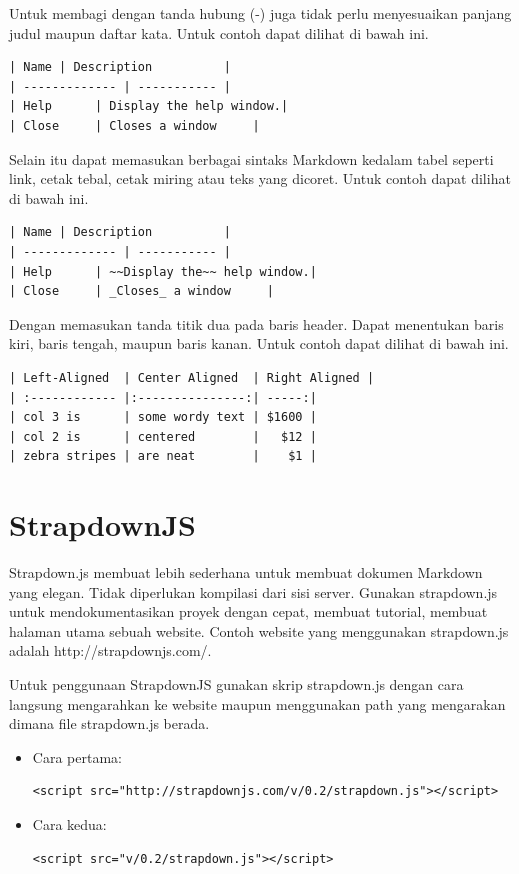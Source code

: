 \begin{enumerate}
Untuk membagi dengan tanda hubung (-) juga tidak perlu menyesuaikan panjang judul maupun daftar kata. Untuk contoh dapat dilihat di bawah ini.
\begin{lstlisting}
| Name | Description          |
| ------------- | ----------- |
| Help      | Display the help window.|
| Close     | Closes a window     |
\end{lstlisting}

Selain itu dapat memasukan berbagai sintaks Markdown kedalam tabel seperti link, cetak tebal, cetak miring atau teks yang dicoret. Untuk contoh dapat dilihat di bawah ini.
\begin{lstlisting}
| Name | Description          |
| ------------- | ----------- |
| Help      | ~~Display the~~ help window.|
| Close     | _Closes_ a window     |
\end{lstlisting}

Dengan memasukan tanda titik dua pada baris header. Dapat menentukan baris kiri, baris tengah, maupun baris kanan. Untuk contoh dapat dilihat di bawah ini.
\begin{lstlisting}
| Left-Aligned  | Center Aligned  | Right Aligned |
| :------------ |:---------------:| -----:|
| col 3 is      | some wordy text | $1600 |
| col 2 is      | centered        |   $12 |
| zebra stripes | are neat        |    $1 |
\end{lstlisting}

\section{StrapdownJS \cite{Strapdownjs:2014}}
\label{sec:stapdownjs}

Strapdown.js membuat lebih sederhana untuk membuat dokumen Markdown yang elegan. Tidak diperlukan kompilasi dari sisi server. Gunakan strapdown.js untuk mendokumentasikan proyek dengan cepat, membuat tutorial, membuat halaman utama sebuah website. Contoh website yang menggunakan strapdown.js adalah http://strapdownjs.com/.

Untuk penggunaan StrapdownJS gunakan skrip strapdown.js dengan cara langsung mengarahkan ke website maupun menggunakan path yang mengarakan dimana file strapdown.js berada.
\begin{itemize}
\item Cara pertama:\\
\begin{lstlisting}
<script src="http://strapdownjs.com/v/0.2/strapdown.js"></script>
\end{lstlisting}
\item Cara kedua:\\
\begin{lstlisting}
<script src="v/0.2/strapdown.js"></script>
\end{lstlisting}
\end{itemize}


\end{enumerate}

